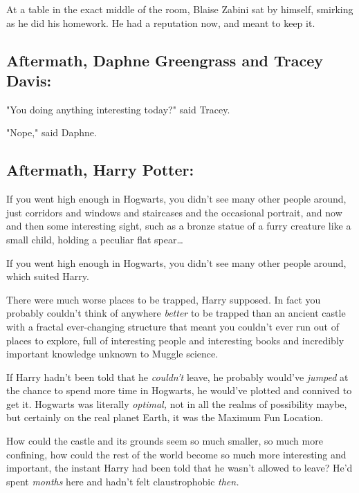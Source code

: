 At a table in the exact middle of the room, Blaise Zabini sat by himself, 
smirking as he did his homework. He had a reputation now, and meant to keep it.
\sbreak
\vspace{-2\baselineskip}
\subsection{Aftermath, Daphne Greengrass and Tracey Davis:}

"You doing anything interesting today?" said Tracey.

"Nope," said Daphne.
\sbreak
\vspace{-2\baselineskip}
\subsection{Aftermath, Harry Potter:}

If you went high enough in Hogwarts, you didn't see many other people around, 
just corridors and windows and staircases and the occasional portrait, and now 
and then some interesting sight, such as a bronze statue of a furry creature 
like a small child, holding a peculiar flat spear{\ldots}

If you went high enough in Hogwarts, you didn't see many other people around, 
which suited Harry.

There were much worse places to be trapped, Harry supposed. In fact you 
probably couldn't think of anywhere \emph{better} to be trapped than an ancient 
castle with a fractal ever-changing structure that meant you couldn't ever run 
out of places to explore, full of interesting people and interesting books and 
incredibly important knowledge unknown to Muggle science.

If Harry hadn't been told that he \emph{couldn't} leave, he probably would've 
\emph{jumped} at the chance to spend more time in Hogwarts, he would've plotted 
and connived to get it. Hogwarts was literally \emph{optimal,} not in all the 
realms of possibility maybe, but certainly on the real planet Earth, it was the 
Maximum Fun Location.

How could the castle and its grounds seem so much smaller, so much more 
confining, how could the rest of the world become so much more interesting and 
important, the instant Harry had been told that he wasn't allowed to leave? 
He'd spent \emph{months} here and hadn't felt claustrophobic \emph{then.}

